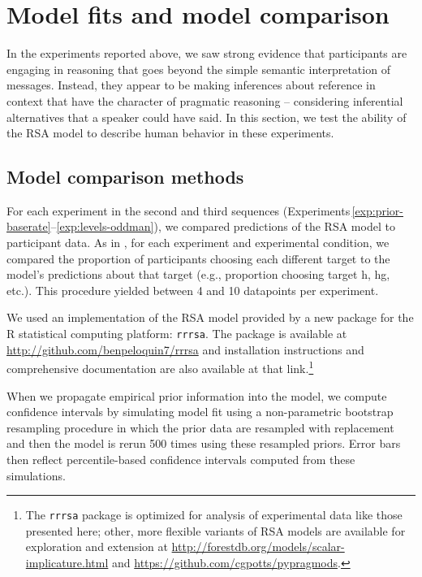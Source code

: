 \documentclass[man,noapacite]{apa2}
\newcounter{Experiment}
\newcommand{\exptrefrange}[2]{Experiments\,\ref{#1}--\ref{#2}}
\begin{document}
\section{Model fits and model comparison}
\label{sec:modelcomp}

In the experiments reported above, we saw strong evidence that participants are engaging in reasoning that goes beyond the simple semantic interpretation of messages. Instead, they appear to be making inferences about reference in context that have the character of pragmatic reasoning -- considering inferential alternatives that a speaker could have said. In this section, we test the ability of the RSA model to describe human behavior in these experiments.


\subsection{Model comparison methods}

For each experiment in the second and third sequences (\exptrefrange{exp:prior-baserate}{exp:levels-oddman}), we compared predictions of the RSA model to participant data. As in , for each experiment and experimental condition, we compared the proportion of participants choosing each different target to the model's predictions about that target (e.g., proportion choosing target {\sc h}, {\sc hg}, etc.). This procedure yielded between 4 and 10 datapoints per experiment.

We used an implementation of the RSA model provided by a new package for the R statistical computing platform: \texttt{rrrsa}. The package is available at \url{http://github.com/benpeloquin7/rrrsa} and installation instructions and comprehensive documentation are also available at that link.\footnote{The \texttt{rrrsa} package is optimized for analysis of experimental data like those presented here; other, more flexible variants of RSA models are available for exploration and extension at \url{http://forestdb.org/models/scalar-implicature.html} and \url{https://github.com/cgpotts/pypragmods}.}

When we propagate empirical prior information into the model, we compute confidence intervals by simulating model fit using a non-parametric bootstrap resampling procedure in which the prior data are resampled with replacement and then the model is rerun 500 times using these resampled priors. Error bars then reflect percentile-based confidence intervals computed from these simulations.
\end{document}
